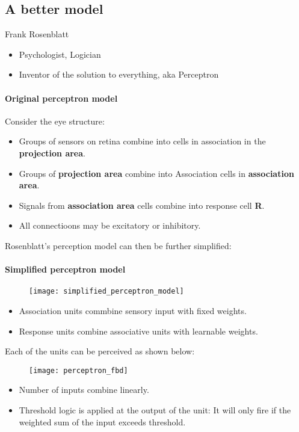 \subsection{A better model}
Frank Rosenblatt
\begin{itemize}
	\item Psychologist, Logician
	\item Inventor of the solution to everything, aka Perceptron
\end{itemize}

\paragraph{Original perceptron model}
Consider the eye structure:
\begin{itemize}
	\item Groups of sensors on retina combine into cells in association in the \textbf{projection area}.
	\item Groups of \textbf{projection area} combine into Association cells in \textbf{association area}.
	\item Signals from \textbf{association area} cells combine into response cell \textbf{R}.
	\item All connectioons may be excitatory or inhibitory.
\end{itemize}

Rosenblatt's perception model can then be further simplified:
\paragraph{Simplified perceptron model}

\begin{figure}[h]
	\centering
	\texttt{[image: simplified\_perceptron\_model]}
\end{figure}

\begin{itemize}
	\item Association units commbine sensory input with fixed weights.
	\item Response units combine associative units with learnable weights.
\end{itemize}

Each of the units can be perceived as shown below:
\begin{figure}[h]
	\centering
	\texttt{[image: perceptron\_fbd]}
\end{figure}

\begin{itemize}
	\item Number of inputs combine linearly.
	\item Threshold logic is applied at the output of the unit: It will only fire if the weighted sum of the input exceeds threshold.
\end{itemize}

